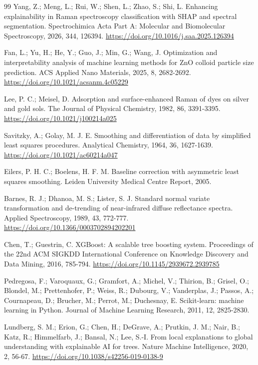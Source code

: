 \documentclass[preprint,12pt]{elsarticle}
\begin{document}
\begin{thebibliography}{99}
 Yang, Z.; Meng, L.; Rui, W.; Shen, L.; Zhao, S.; Shi, L. Enhancing explainability in Raman spectroscopy classification with SHAP and spectral segmentation. Spectrochimica Acta Part A: Molecular and Biomolecular Spectroscopy, 2026, 344, 126394. \url{https://doi.org/10.1016/j.saa.2025.126394}

 Fan, L.; Yu, H.; He, Y.; Guo, J.; Min, G.; Wang, J. Optimization and interpretability analysis of machine learning methods for ZnO colloid particle size prediction. ACS Applied Nano Materials, 2025, 8, 2682-2692. \url{https://doi.org/10.1021/acsanm.4c05229}

 Lee, P. C.; Meisel, D. Adsorption and surface-enhanced Raman of dyes on silver and gold sols. The Journal of Physical Chemistry, 1982, 86, 3391-3395. \url{https://doi.org/10.1021/j100214a025}

 Savitzky, A.; Golay, M. J. E. Smoothing and differentiation of data by simplified least squares procedures. Analytical Chemistry, 1964, 36, 1627-1639. \url{https://doi.org/10.1021/ac60214a047}

 Eilers, P. H. C.; Boelens, H. F. M. Baseline correction with asymmetric least squares smoothing. Leiden University Medical Centre Report, 2005.

 Barnes, R. J.; Dhanoa, M. S.; Lister, S. J. Standard normal variate transformation and de-trending of near-infrared diffuse reflectance spectra. Applied Spectroscopy, 1989, 43, 772-777. \url{https://doi.org/10.1366/0003702894202201}

 Chen, T.; Guestrin, C. XGBoost: A scalable tree boosting system. Proceedings of the 22nd ACM SIGKDD International Conference on Knowledge Discovery and Data Mining, 2016, 785-794. \url{https://doi.org/10.1145/2939672.2939785}

 Pedregosa, F.; Varoquaux, G.; Gramfort, A.; Michel, V.; Thirion, B.; Grisel, O.; Blondel, M.; Prettenhofer, P.; Weiss, R.; Dubourg, V.; Vanderplas, J.; Passos, A.; Cournapeau, D.; Brucher, M.; Perrot, M.; Duchesnay, E. Scikit-learn: machine learning in Python. Journal of Machine Learning Research, 2011, 12, 2825-2830.

 Lundberg, S. M.; Erion, G.; Chen, H.; DeGrave, A.; Prutkin, J. M.; Nair, B.; Katz, R.; Himmelfarb, J.; Bansal, N.; Lee, S.-I. From local explanations to global understanding with explainable AI for trees. Nature Machine Intelligence, 2020, 2, 56-67. \url{https://doi.org/10.1038/s42256-019-0138-9}


\end{thebibliography}
\end{document}
